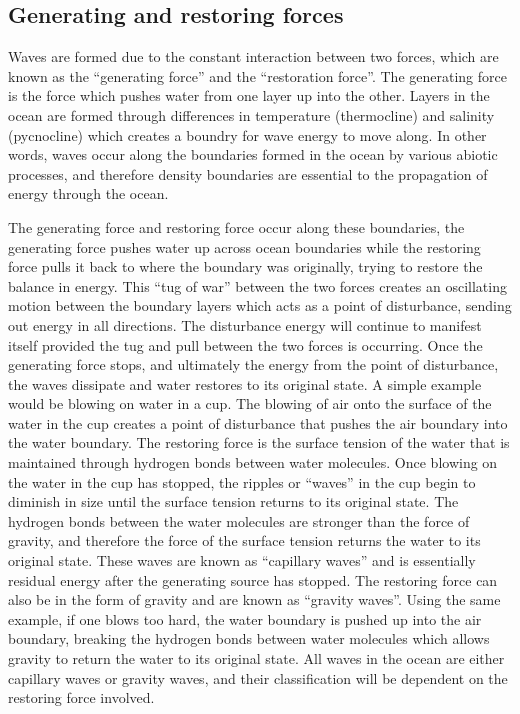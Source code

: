 \documentclass[
]{article}
\begin{document}
\hypertarget{generating-and-restoring-forces}{%
\subsection{Generating and restoring
forces}\label{generating-and-restoring-forces}}

Waves are formed due to the constant interaction between two forces,
which are known as the ``generating force'' and the ``restoration
force''. The generating force is the force which pushes water from one
layer up into the other. Layers in the ocean are formed through
differences in temperature (thermocline) and salinity (pycnocline) which
creates a boundry for wave energy to move along. In other words, waves
occur along the boundaries formed in the ocean by various abiotic
processes, and therefore density boundaries are essential to the
propagation of energy through the ocean.

The generating force and restoring force occur along these boundaries,
the generating force pushes water up across ocean boundaries while the
restoring force pulls it back to where the boundary was originally,
trying to restore the balance in energy. This ``tug of war'' between the
two forces creates an oscillating motion between the boundary layers
which acts as a point of disturbance, sending out energy in all
directions. The disturbance energy will continue to manifest itself
provided the tug and pull between the two forces is occurring. Once the
generating force stops, and ultimately the energy from the point of
disturbance, the waves dissipate and water restores to its original
state. A simple example would be blowing on water in a cup. The blowing
of air onto the surface of the water in the cup creates a point of
disturbance that pushes the air boundary into the water boundary. The
restoring force is the surface tension of the water that is maintained
through hydrogen bonds between water molecules. Once blowing on the
water in the cup has stopped, the ripples or ``waves'' in the cup begin
to diminish in size until the surface tension returns to its original
state. The hydrogen bonds between the water molecules are stronger than
the force of gravity, and therefore the force of the surface tension
returns the water to its original state. These waves are known as
``capillary waves'' and is essentially residual energy after the
generating source has stopped. The restoring force can also be in the
form of gravity and are known as ``gravity waves''. Using the same
example, if one blows too hard, the water boundary is pushed up into the
air boundary, breaking the hydrogen bonds between water molecules which
allows gravity to return the water to its original state. All waves in
the ocean are either capillary waves or gravity waves, and their
classification will be dependent on the restoring force involved.
\end{document}
